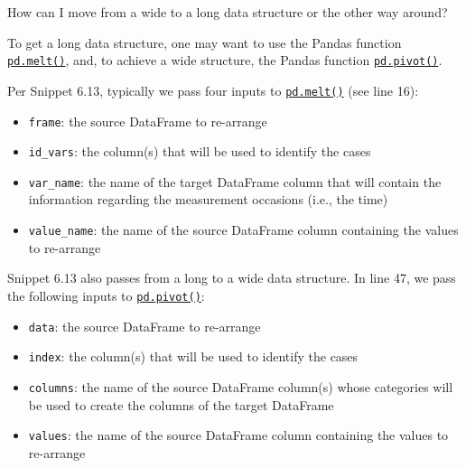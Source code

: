 \documentclass[a4paper,11pt]{book}
\newcommand{\question}[1]{%
    \begin{tcolorbox}[colback=comp_c!10,colframe=comp_c,sidebyside align=top,width=\linewidth,before skip=1ex]
        #1
    \end{tcolorbox}
    \switchcolumn%
}
\newcommand{\note}[1]{%
    \begin{tcolorbox}[colback=white!0,colframe=white!10,width=\linewidth,before skip=1ex]
        #1
    \end{tcolorbox}
}
\begin{document}
\begin{paracol}{2}
	\question{\raggedright How can I move from a wide to a long data structure or the other way around?}
	\note{To get a long data structure, one may want to use the Pandas function \href{https://pandas.pydata.org/docs/reference/api/pandas.melt.html?highlight=melt#pandas.melt}{\texttt{pd.melt()}}, and, to achieve a wide structure, the Pandas function \href{https://pandas.pydata.org/docs/reference/api/pandas.pivot.html?highlight=pivot#pandas.pivot}{\texttt{pd.pivot()}}.

	\quad Per Snippet 6.13, typically we pass four inputs to \href{https://pandas.pydata.org/docs/reference/api/pandas.melt.html?highlight=melt#pandas.melt}{\texttt{pd.melt()}} (see line 16):
	
	\begin{itemize}
		\item  \texttt{frame}: the source DataFrame to re-arrange 
		\item  \texttt{id\_vars}: the column(s) that will be used to identify the cases
		\item  \texttt{var\_name}: the name of the target DataFrame column that will contain the information regarding the measurement occasions (i.e., the time)
		\item  \texttt{value\_name}: the name of the source DataFrame column containing the values to re-arrange
	\end{itemize}

	\quad Snippet 6.13 also passes from a long to a wide data structure. In line 47, we pass the following inputs to \href{https://pandas.pydata.org/docs/reference/api/pandas.pivot.html?highlight=pivot#pandas.pivot}{\texttt{pd.pivot()}}:
	
	\begin{itemize}
		\item \texttt{data}: the source DataFrame to re-arrange
		\item \texttt{index}: the column(s) that will be used to identify the cases
		\item \texttt{columns}: the name of the source DataFrame column(s) whose categories will be used to create the columns of the target DataFrame
		\item \texttt{values}: the name of the source DataFrame column containing the values to re-arrange
	\end{itemize}
	}
\end{paracol}
\end{document}
